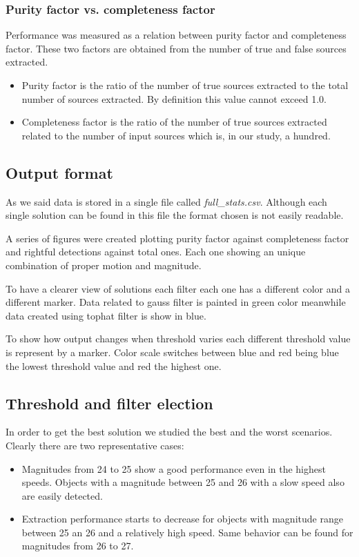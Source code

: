 \documentclass{article}
\begin{document}
\subsubsection{Purity factor vs. completeness factor}
Performance was measured as a relation between purity factor and completeness factor. These two factors are obtained from the number of true and false sources extracted.
\begin{itemize}
\item Purity factor is the ratio of the number of true sources extracted to the total number of sources extracted. By definition this value cannot exceed 1.0. 
\item Completeness factor is the ratio of the number of true sources extracted related to the number of input sources which is, in our study, a hundred. 
\end{itemize}

\subsection{Output format}
As we said data is stored in a single file called \textit{full\_stats.csv}. Although each single solution can be found in this file the format chosen is not easily readable.
\par
A series of figures were created plotting purity factor against completeness factor and rightful detections against total ones. Each one showing an unique combination of proper motion and magnitude.
\par
To have a clearer view of solutions each filter each one has a different color and a different marker. Data related to gauss filter is painted in green color meanwhile data created using tophat filter is show in blue.
\par
To show how output changes when threshold varies each different threshold value is represent by a marker. Color scale switches between blue and red being blue the lowest threshold value and red the highest one.

\subsection{Threshold and filter election}
In order to get the best solution we studied the best and the worst scenarios. Clearly there are two representative cases:
\begin{itemize}
\item Magnitudes from 24 to 25 show a good performance even in the highest speeds.
Objects with a magnitude between 25 and 26 with a slow speed also are easily detected.
\item Extraction performance starts to decrease for objects with magnitude range between 25 an 26 and a relatively high speed. Same behavior can be found for magnitudes from 26 to 27.  
\end{itemize}
\end{document}
